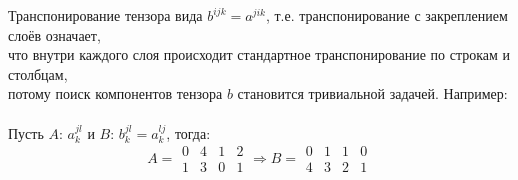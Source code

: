 \documentclass{article}
\begin{document}
\begin{center}
Транспонирование тензора вида $b^{ijk} = a^{jik}$, т.е. транспонирование с закреплением слоёв означает, \\
что внутри каждого слоя происходит стандартное транспонирование по строкам и столбцам, \\
потому поиск компонентов тензора $b$ становится тривиальной задачей. Например: \\ \, \\

Пусть $A$: $a^{jl}_k$ и $B$: $b^{jl}_k = a^{lj}_k$, тогда:
$$A = \begin{array}{||cc|cc||}
0 & 4 & 1 & 2 \\
1 & 3 & 0 & 1
\end{array} \Rightarrow B = \begin{array}{||cc|cc||}
0 & 1 & 1 & 0 \\
4 & 3 & 2 & 1
\end{array}$$
\end{center}
\end{document}
